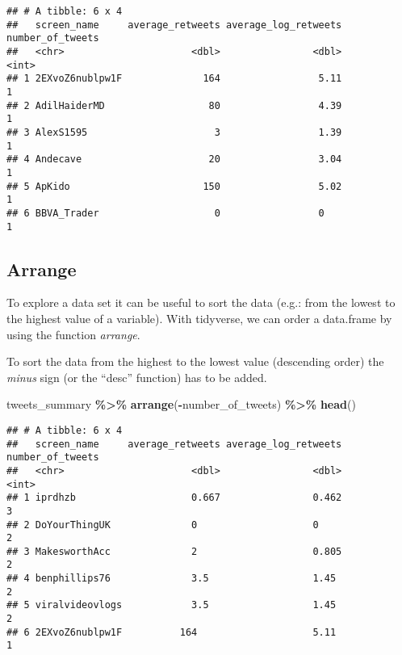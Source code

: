 \documentclass[
]{article}
\newenvironment{Shaded}{\begin{snugshade}}{\end{snugshade}}
\newcommand{\FunctionTok}[1]{\textcolor[rgb]{0.13,0.29,0.53}{\textbf{#1}}}
\newcommand{\NormalTok}[1]{#1}
\newcommand{\SpecialCharTok}[1]{\textcolor[rgb]{0.81,0.36,0.00}{\textbf{#1}}}
\begin{document}
\begin{verbatim}
## # A tibble: 6 x 4
##   screen_name     average_retweets average_log_retweets number_of_tweets
##   <chr>                      <dbl>                <dbl>            <int>
## 1 2EXvoZ6nublpw1F              164                 5.11                1
## 2 AdilHaiderMD                  80                 4.39                1
## 3 AlexS1595                      3                 1.39                1
## 4 Andecave                      20                 3.04                1
## 5 ApKido                       150                 5.02                1
## 6 BBVA_Trader                    0                 0                   1
\end{verbatim}

\subsection{Arrange}\label{arrange}

To explore a data set it can be useful to sort the data (e.g.: from the lowest to the highest value of a variable). With tidyverse, we can order a data.frame by using the function \emph{arrange}.

To sort the data from the highest to the lowest value (descending order) the \emph{minus} sign (or the ``desc'' function) has to be added.

\begin{Shaded}
\begin{Highlighting}[]
\NormalTok{tweets\_summary  }\SpecialCharTok{\%\textgreater{}\%}
  \FunctionTok{arrange}\NormalTok{(}\SpecialCharTok{{-}}\NormalTok{number\_of\_tweets) }\SpecialCharTok{\%\textgreater{}\%}
  \FunctionTok{head}\NormalTok{()}
\end{Highlighting}
\end{Shaded}

\begin{verbatim}
## # A tibble: 6 x 4
##   screen_name     average_retweets average_log_retweets number_of_tweets
##   <chr>                      <dbl>                <dbl>            <int>
## 1 iprdhzb                    0.667                0.462                3
## 2 DoYourThingUK              0                    0                    2
## 3 MakesworthAcc              2                    0.805                2
## 4 benphillips76              3.5                  1.45                 2
## 5 viralvideovlogs            3.5                  1.45                 2
## 6 2EXvoZ6nublpw1F          164                    5.11                 1
\end{verbatim}
\end{document}
